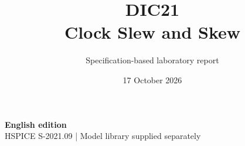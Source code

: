 \documentclass[11pt,a4paper]{article}
\title{\color{accent}DIC21\\[4pt]Clock Slew and Skew}
\author{Specification-based laboratory report}
\date{17 October 2026}
\begin{document}
\maketitle
\begin{center}\small\textbf{English edition}\\
HSPICE S-2021.09 \quad | \quad Model library supplied separately
\end{center}


\end{document}
